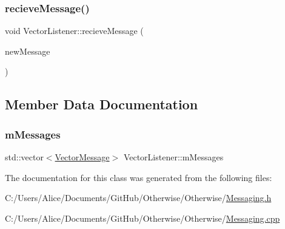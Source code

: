 \mbox{\label{class_vector_listener_aa9df46e5a73a653f18ab42866a1ea4f5}} 
\subsubsection{\texorpdfstring{recieve\+Message()}{recieveMessage()}}
{\footnotesize\ttfamily void Vector\+Listener\+::recieve\+Message (\begin{DoxyParamCaption}\item[{\hyperlink{struct_vector_message}{Vector\+Message}}]{new\+Message }\end{DoxyParamCaption})}



\subsection{Member Data Documentation}
\mbox{\label{class_vector_listener_ab54f0ab73d1c32b9365d79a502de7ea1}} 
\subsubsection{\texorpdfstring{m\+Messages}{mMessages}}
{\footnotesize\ttfamily std\+::vector$<$\hyperlink{struct_vector_message}{Vector\+Message}$>$ Vector\+Listener\+::m\+Messages\hspace{0.3cm}{\ttfamily [private]}}



The documentation for this class was generated from the following files\+:\begin{DoxyCompactItemize}
\item 
C\+:/\+Users/\+Alice/\+Documents/\+Git\+Hub/\+Otherwise/\+Otherwise/\hyperlink{_messaging_8h}{Messaging.\+h}\item 
C\+:/\+Users/\+Alice/\+Documents/\+Git\+Hub/\+Otherwise/\+Otherwise/\hyperlink{_messaging_8cpp}{Messaging.\+cpp}\end{DoxyCompactItemize}
